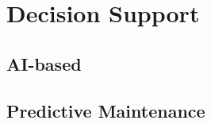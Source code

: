\section{Decision Support}\label{sec:decision-support}

\subsection{AI-based}

\subsection{Predictive Maintenance}